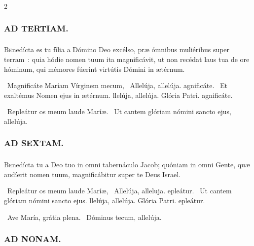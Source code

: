 \documentclass[9pt,twoside]{extarticle}
\begin{document}
\begin{multicols}{2}
\subsubsection*{\center \textsc{AD TERTIAM.}}
\subsubsection*{}
\lettrine{B}enedícta es tu fília a Dómino Deo excélso, præ ómnibus muliéribus super terram~: quia hódie nomen tuum ita magnificávit, ut non recédat laus tua de ore hóminum, qui mémores fúerint virtútis Dómini in ætérnum.

\begin{tightlist}{}
\item {}~Magnificáte Maríam Vírginem mecum, \textred{*}~Allelúja, allelúja. agnificáte. ~Et exaltémus Nomen ejus in ætérnum. llelúja, allelúja. Glória Patri. agnificáte.
\item {}~Repleátur os meum laude Maríæ. ~Ut cantem glóriam nómini sancto ejus, allelúja.
\end{tightlist}

\subsubsection*{\center \textsc{AD SEXTAM.}}
\subsubsection*{}
\lettrine{B}enedícta tu a Deo tuo in omni tabernáculo Jacob; quóniam in omni Gente, quæ audíerit nomen tuum, magnificábitur super te Deus Israel.

\begin{tightlist}{}
\item {}~Repleátur os meum laude Maríæ, \textred{*}~Allelúja, alleluja. epleátur. ~Ut cantem glóriam nómini sancto ejus. llelúja, allelúja. Glória Patri. epleátur.
\item {}~Ave María, grátia plena. ~Dóminus tecum, allelúja.
\end{tightlist}

\subsubsection*{\center \textsc{AD NONAM.}}

\end{multicols}
\end{document}
